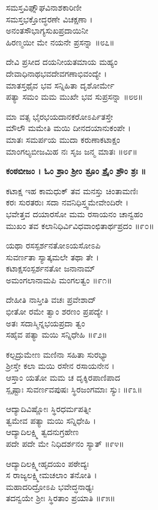 	ಸಮಸ್ತವಿಘ್ನೌಘವಿನಾಶಕಾರಿಣೀ\\ ಸಮಸ್ತಭಕ್ತೋದ್ಧರಣೇ ವಿಚಕ್ಷಣಾ ।\\
	ಅನಂತಸೌಭಾಗ್ಯಸುಖಪ್ರದಾಯಿನೀ\\ ಹಿರಣ್ಮಯೀ ಮೇ ನಯನೇ ಪ್ರಸನ್ನಾ ॥೮೭॥

ದೇವಿ ಪ್ರಸೀದ ದಯನೀಯತಮಾಯ ಮಹ್ಯಂ\\ ದೇವಾಧಿನಾಥಭವದೇವಗಣಾಭಿವಂದ್ಯೇ ।\\
ಮಾತಸ್ತಥೈವ ಭವ ಸನ್ನಿಹಿತಾ ದೃಶೋರ್ಮೇ\\ ಪತ್ಯಾ ಸಮಂ ಮಮ ಮುಖೇ ಭವ ಸುಪ್ರಸನ್ನಾ ॥೮೮॥

	ಮಾ ವತ್ಸ ಭೈರಭಯದಾನಕರೋಽರ್ಪಿತಸ್ತೇ\\ ಮೌಲೌ ಮಮೇತಿ ಮಯಿ ದೀನದಯಾನುಕಂಪೇ ।\\
	ಮಾತಃ ಸಮರ್ಪಯ ಮುದಾ ಕರುಣಾಕಟಾಕ್ಷಂ\\ ಮಾಂಗಲ್ಯಬೀಜಮಿಹ ನಃ ಸೃಜ ಜನ್ಮ ಮಾತಃ ॥೮೯॥

{\bfseries  ಕಂಠಬೀಜಂ । ಓಂ ಶ್ರಾಂ ಶ್ರೀಂ ಶ್ರೂಂ ಶ್ರೈಂ ಶ್ರೌಂ ಶ್ರಃ ॥}

ಕಟಾಕ್ಷ ಇಹ ಕಾಮಧುಕ್ ತವ ಮನಸ್ತು ಚಿಂತಾಮಣಿಃ\\ ಕರಃ ಸುರತರುಃ ಸದಾ ನವನಿಧಿಸ್ತ್ವಮೇವೇಂದಿರೇ ।\\
ಭವೇತ್ತವ ದಯಾರಸೋ ಮಮ ರಸಾಯನಂ ಚಾನ್ವಹಂ\\ ಮುಖಂ ತವ ಕಲಾನಿಧಿರ್ವಿವಿಧವಾಂಛಿತಾರ್ಥಪ್ರದಂ ॥೯೦॥

	ಯಥಾ ರಸಸ್ಪರ್ಶನತೋಽಯಸೋಽಪಿ\\ ಸುವರ್ಣತಾ ಸ್ಯಾತ್ಕಮಲೇ ತಥಾ ತೇ ।\\
	ಕಟಾಕ್ಷಸಂಸ್ಪರ್ಶನತೋ ಜನಾನಾಮ್ \\ಅಮಂಗಲಾನಾಮಪಿ ಮಂಗಲತ್ವಂ ॥೯೧॥
	
ದೇಹೀತಿ ನಾಸ್ತೀತಿ ವಚಃ ಪ್ರವೇಶಾದ್\\ಭೀತೋ ರಮೇ ತ್ವಾಂ ಶರಣಂ ಪ್ರಪದ್ಯೇ ।\\
ಅತಃ ಸದಾಸ್ಮಿನ್ನಭಯಪ್ರದಾ ತ್ವಂ\\ ಸಹೈವ ಪತ್ಯಾ ಮಯಿ ಸನ್ನಿಧೇಹಿ ॥೯೨॥

	ಕಲ್ಪದ್ರುಮೇಣ ಮಣಿನಾ ಸಹಿತಾ ಸುರಭ್ಯಾ \\ಶ್ರೀಸ್ತೇ ಕಲಾ ಮಯಿ ರಸೇನ ರಸಾಯನೇನ ।\\
	ಆಸ್ತಾಂ ಯತೋ ಮಮ ಚ ದೃಕ್ಶಿರಪಾಣಿಪಾದ\\ಸ್ಪೃಷ್ಟಾಃ ಸುವರ್ಣವಪುಷಃ ಸ್ಥಿರಜಂಗಮಾಃ ಸ್ಯುಃ ॥೯೩॥

ಆದ್ಯಾದಿವಿಷ್ಣೋಃ ಸ್ಥಿರಧರ್ಮಪತ್ನೀ\\ ತ್ವಮೇವ ಪತ್ಯಾ ಮಯಿ ಸನ್ನಿಧೇಹಿ ।\\
ಆದ್ಯಾದಿಲಕ್ಷ್ಮಿ ತ್ವದನುಗ್ರಹೇಣ\\ ಪದೇ ಪದೇ ಮೇ ನಿಧಿದರ್ಶನಂ ಸ್ಯಾತ್ ॥೯೪॥

	ಆದ್ಯಾದಿಲಕ್ಷ್ಮೀಹೃದಯಂ ಪಠೇದ್ಯಃ\\ ಸ ರಾಜ್ಯಲಕ್ಷ್ಮೀಮಚಲಾಂ ತನೋತಿ ।\\
	ಮಹಾದರಿದ್ರೋಽಪಿ ಭವೇದ್ಧನಾಢ್ಯಃ \\ತದನ್ವಯೇ ಶ್ರೀಃ ಸ್ಥಿರತಾಂ ಪ್ರಯಾತಿ ॥೯೫॥

